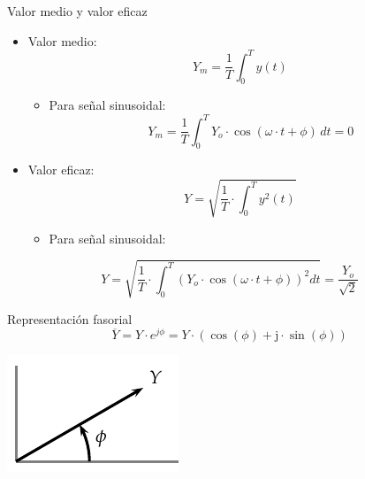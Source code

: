 \documentclass[xcolor={usenames,svgnames,dvipsnames}]{beamer}
\begin{document}
\begin{frame}[label={sec:org6c5e235}]{Valor medio y valor eficaz}
\begin{itemize}
\item \alert{Valor medio}: $$Y_m=\frac{1}{T}\int_{0}^{T}y(t)$$

\begin{itemize}
\item Para señal sinusoidal:
$$Y_m=\frac{1}{T}\int_{0}^{T}Y_{o}\cdot\cos(\omega\cdot
            t+\phi)\, dt=0$$
\end{itemize}

\item \alert{Valor eficaz}:
$$Y = \sqrt{\frac{1}{T}\cdot\int_{0}^{T}y^{2}(t)}$$

\begin{itemize}
\item Para señal sinusoidal:
\end{itemize}
\end{itemize}

$$Y=\sqrt{\frac{1}{T}\cdot\int_{0}^{T}\left(Y_{o}\cdot\cos(\omega\cdot
      t+\phi)\right)^{2}dt}=\frac{Y_{o}}{\sqrt{2}}$$
\end{frame}

\begin{frame}[label={sec:orgc484455}]{Representación fasorial}
$$\overline{Y}=Y\cdot e^{j\phi}=Y\cdot(\cos(\phi)+\mathrm{j}\cdot\sin(\phi))$$

\begin{center}
\includegraphics[width=.9\linewidth]{../figs/Fasor.pdf}
\end{center}
\end{frame}
\end{document}
